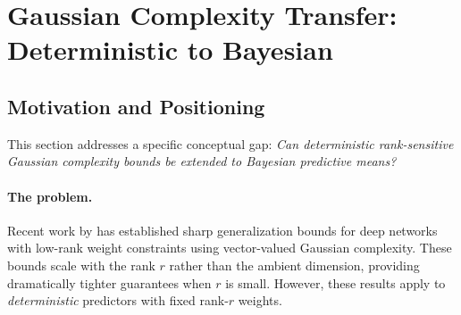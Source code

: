 \documentclass{article}
\theoremstyle{plain}
\theoremstyle{definition}
\theoremstyle{remark}
\begin{document}
%
%
%
%
%

\section{Gaussian Complexity Transfer: Deterministic to Bayesian}\label{app:gaussian_complexity}

\subsection{Motivation and Positioning}\label{app:gaussian_complexity:motivation}

This section addresses a specific conceptual gap: \emph{Can deterministic rank-sensitive Gaussian complexity bounds be extended to Bayesian predictive means?}

\paragraph{The problem.} Recent work by \citet{pinto2025on} has established sharp generalization bounds for deep networks with low-rank weight constraints using vector-valued Gaussian complexity. These bounds scale with the rank $r$ rather than the ambient dimension, providing dramatically tighter guarantees when $r$ is small. However, these results apply to \emph{deterministic} predictors with fixed rank-$r$ weights.
\end{document}
